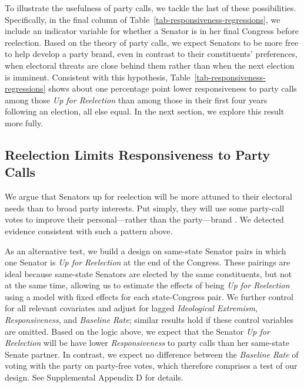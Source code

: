 \documentclass[12pt]{article}
\begin{document}
To illustrate the usefulness of party calls, we tackle the last of these possibilities. Specifically, in the final column of Table~\ref{tab-responsiveness-regressions}, we include an indicator variable for whether a Senator is in her final Congress before reelection.  Based on the theory of party calls, we expect Senators to be more free to help develop a party brand, even in contrast to their constituents' preferences, when electoral threats are close behind them rather than when the next election is imminent.  Consistent with this hypothesis, Table~\ref{tab-responsiveness-regressions} shows about one percentage point lower responsiveness to party calls among those \textit{Up for Reelection} than among those in their first four years following an election, all else equal.  In the next section, we explore this result more fully.

\subsection*{Reelection Limits Responsiveness to Party Calls}

We argue that Senators up for reelection will be more attuned to their electoral needs than to broad party interests. Put simply, they will use some party-call votes to improve their personal---rather than the party---brand
\citep[e.g.,][]{Canes-Wrone:2002, Carson:2010}.  We detected evidence consistent with such a pattern above.

As an alternative test, we build a design on same-state Senator pairs in which one Senator is \textit{Up for Reelection} at the end of the Congress.  These pairings are ideal because same-state Senators are elected by the same constituents, but not at the same time, allowing us to estimate the effects of being \textit{Up for Reelection} using a model with fixed effects for each state-Congress pair.  We further control for all relevant covariates and adjust for lagged \textit{Ideological Extremism}, \textit{Responsiveness}, and \textit{Baseline Rate}; similar results hold if these control variables are omitted.
Based on the logic above, we expect that the Senator \textit{Up for Reelection} will be have lower \textit{Responsiveness} to party calls than her same-state Senate partner.  In contrast, we expect no difference between the \textit{Baseline Rate} of voting with the party on party-free votes, which therefore comprises a test of our design. See Supplemental Appendix D for details.
\end{document}

